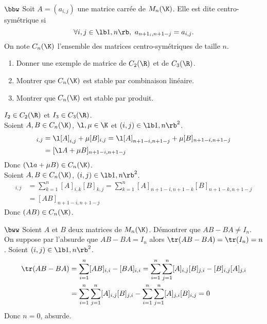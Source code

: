 \documentclass[11pt]{article}
\begin{document}
\begin{exercice}{$\bbw$}{}
    Soit $A=(a_{i,j})$ une matrice carrée de $M_n(\K)$. Elle est dite centro-symétrique si
    \begin{equation*}
        \forall i,j\in\lb1,n\rb, ~ a_{n+1_i,n+1-j}=a_{i,j}.
    \end{equation*}
    On note $C_n(\K)$ l'ensemble des matrices centro-symétriques de taille $n$.
    \begin{enumerate}
        \item Donner une exemple de matrice de $C_2(\R)$ et de $C_3(\R)$.
        \item Montrer que $C_n(\K)$ est stable par combinaison linéaire.
        \item Montrer que $C_n(\K)$ est stable par produit.
    \end{enumerate}
    \tcblower
     $I_2\in C_2(\R)$ et $I_3\in C_3(\R)$.\\
     Soient $A,B\in C_n(\K)$, $\l,\mu\in\K$ et $(i,j)\in\lb1,n\rb^2$.
    \begin{align*}
        [\l A + \mu B]_{i,j}&=\l[A]_{i,j}+\mu[B]_{i,j}=\l[A]_{n+1-i,n+1-j}+\mu[B]_{n+1-i,n+1-j}\\
        &=[\l A +\mu B]_{n+1-i,n+1-j}
    \end{align*}
    Donc $(\l a+\mu B)\in C_n(\K)$.\\
     Soient $A,B\in C_n(\K)$, $(i,j)\in\lb1,n\rb^2$.
    \begin{align*}
        [AB]_{i,j}&=\sum_{k=1}^n[A]_{i,k}[B]_{k,j}=\sum_{k=1}^n[A]_{n+1-i,n+1-k}[B]_{n+1-k,n+1-j}\\
        &=[AB]_{n+1-i,n+1-j}
    \end{align*}
    Donc $(AB)\in C_n(\K)$.
\end{exercice}

\begin{exercice}{$\bww$}{}
    Soient $A$ et $B$ deux matrices de $M_n(\K)$. Démontrer que $AB-BA\neq I_n$. 
    \tcblower
    On suppose par l'absurde que $AB-BA=I_n$ alors $\tr(AB-BA)=\tr(I_n)=n$. Soient $(i,j)\in\lb1,n\rb^2$.
    \begin{align*}
        \tr(AB-BA)&=\sum_{i=1}^n[AB]_{i,i}-[BA]_{i,i}=\sum_{i=1}^n\sum_{j=1}^n[A]_{i,j}[B]_{j,i}-[B]_{i,j}[A]_{j,i}\\
        &=\sum_{i=1}^n\sum_{j=1}^n[A]_{i,j}[B]_{j,i}-\sum_{i=1}^n\sum_{j=1}^n[A]_{j,i}[B]_{i,j}=0
    \end{align*}
    Donc $n=0$, absurde.
\end{exercice}
\end{document}
